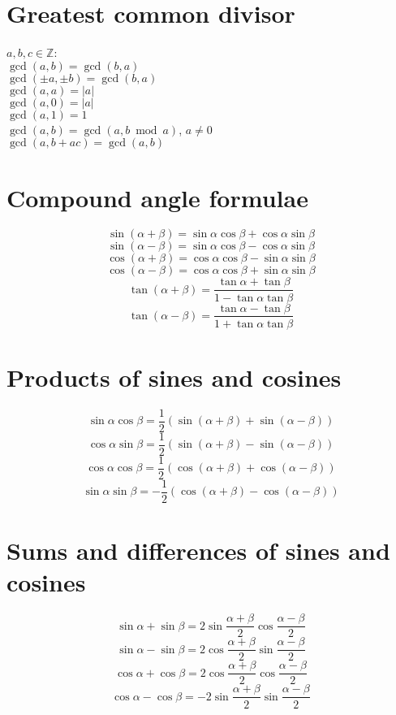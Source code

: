 \documentclass[a4paper, 10pt]{scrartcl}
\begin{document}
\section{Greatest common divisor}
$a, b, c\in \mathbb{Z}$:\\
$\gcd(a, b) = \gcd(b, a)$\\
$\gcd(\pm a, \pm b) = \gcd(b, a)$\\
$\gcd(a, a) = \vert a\vert$\\
$\gcd(a, 0) = \vert a\vert$\\
$\gcd(a, 1) = 1$\\
$\gcd(a, b) = \gcd(a, b\bmod a)$, $a\neq 0$\\
$\gcd(a, b + ac) = \gcd(a, b)$\\

\section{Compound angle formulae}
\[\sin{(\alpha + \beta)} = \sin{\alpha}\cos{\beta} + \cos{\alpha}\sin{\beta}\]
\[\sin{(\alpha - \beta)} = \sin{\alpha}\cos{\beta} - \cos{\alpha}\sin{\beta}\]
\[\cos{(\alpha + \beta)} = \cos{\alpha}\cos{\beta} - \sin{\alpha}\sin{\beta}\]
\[\cos{(\alpha - \beta)} = \cos{\alpha}\cos{\beta} + \sin{\alpha}\sin{\beta}\]
\[\tan{(\alpha + \beta)} = \frac{\tan{\alpha} + \tan{\beta}}{1 - \tan{\alpha}\tan{\beta}}\]
\[\tan{(\alpha - \beta)} = \frac{\tan{\alpha} - \tan{\beta}}{1 + \tan{\alpha}\tan{\beta}}\]

\section{Products of sines and cosines}
\[\sin{\alpha}\cos{\beta} = \frac{1}{2}(\sin{(\alpha + \beta)} + \sin{(\alpha - \beta)})\]
\[\cos{\alpha}\sin{\beta} = \frac{1}{2}(\sin{(\alpha + \beta)} - \sin{(\alpha - \beta)})\]
\[\cos{\alpha}\cos{\beta} = \frac{1}{2}(\cos{(\alpha + \beta)} + \cos{(\alpha - \beta)})\]
\[\sin{\alpha}\sin{\beta} = -\frac{1}{2}(\cos{(\alpha + \beta)} - \cos{(\alpha - \beta)})\]

\section{Sums and differences of sines and cosines}
\[\sin{\alpha} + \sin{\beta} = 2\sin{\frac{\alpha + \beta}{2}}\cos{\frac{\alpha - \beta}{2}}\]
\[\sin{\alpha} - \sin{\beta} = 2\cos{\frac{\alpha + \beta}{2}}\sin{\frac{\alpha - \beta}{2}}\]
\[\cos{\alpha} + \cos{\beta} = 2\cos{\frac{\alpha + \beta}{2}}\cos{\frac{\alpha - \beta}{2}}\]
\[\cos{\alpha} - \cos{\beta} = -2\sin{\frac{\alpha + \beta}{2}}\sin{\frac{\alpha - \beta}{2}}\]
\end{document}

